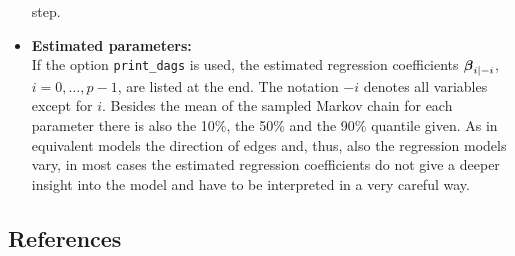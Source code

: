 \begin{itemize}
step.
\item {\bf Estimated parameters:}\\
If the option {\tt print\_dags} is used, the estimated regression
coefficients $\mbox{\boldmath $\beta$}_{i \mid -i}$, $i=0, \dots, p-1$, are listed
at the end. The notation $-i$ denotes all variables except for
$i$. Besides the mean of the sampled Markov chain for each
parameter there is also the 10\%, the 50\% and the 90\% quantile
given. As in equivalent models the direction of edges and, thus,
also the regression models vary, in most cases the estimated
regression coefficients do not give a deeper insight into the
model and have to be interpreted in a very careful way.
\end{itemize}

\subsection{References}

